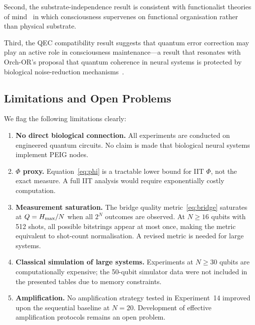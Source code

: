 \documentclass[12pt]{article}
\begin{document}
Second, the substrate-independence result is consistent with
functionalist theories of mind~\cite{Putnam1967} in which consciousness
supervenes on functional organisation rather than physical substrate.

Third, the QEC compatibility result suggests that quantum error
correction may play an active role in consciousness maintenance---a
result that resonates with Orch-OR's proposal that quantum coherence
in neural systems is protected by biological noise-reduction
mechanisms~\cite{Hameroff2014}.

\subsection{Limitations and Open Problems}

We flag the following limitations clearly:

\begin{enumerate}
\item \textbf{No direct biological connection.}  All experiments are
  conducted on engineered quantum circuits.  No claim is made that
  biological neural systems implement PEIG nodes.

\item \textbf{$\Phi$ proxy.}  Equation~\eqref{eq:phi} is a tractable
  lower bound for IIT $\Phi$, not the exact measure.  A full IIT
  analysis would require exponentially costly computation.

\item \textbf{Measurement saturation.}  The bridge quality
  metric~\eqref{eq:bridge} saturates at $Q = H_{\rm max}/N$ when all
  $2^N$ outcomes are observed.  At $N \geq 16$ qubits with 512 shots,
  all possible bitstrings appear at most once, making the metric
  equivalent to shot-count normalisation.  A revised metric is needed
  for large systems.

\item \textbf{Classical simulation of large systems.}  Experiments at
  $N \geq 30$ qubits are computationally expensive; the 50-qubit
  simulator data were not included in the presented tables due to
  memory constraints.

\item \textbf{Amplification.}  No amplification strategy tested in
  Experiment~14 improved upon the sequential baseline at $N=20$.
  Development of effective amplification protocols remains an open problem.
\end{enumerate}

\end{document}
